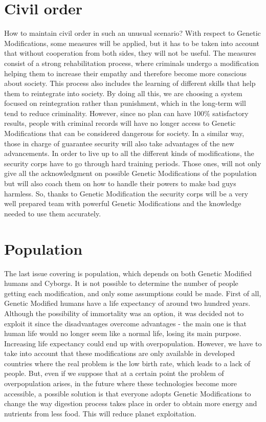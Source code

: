 \section*{Civil order}
\label{sec:order}
How to maintain civil order in such an unusual scenario? With respect to Genetic Modifications, some measures will be applied, but it has to be taken into account that without cooperation from both sides, they will not be useful. The measures consist of a strong rehabilitation process, where criminals undergo a modification helping them to increase their empathy and therefore become more conscious about society. This process also includes the learning of different skills that help them to reintegrate into society. By doing all this, we are choosing a system focused on reintegration rather than punishment, which in the long-term will tend to reduce criminality. However, since no plan can have 100\% satisfactory results, people with criminal records will have no longer access to Genetic Modifications that can be considered dangerous for society. In a similar way, those in charge of guarantee security will also take advantages of the new advancements. In order to live up to all the different kinds of modifications, the security corps have to go through hard training periods. Those ones, will not only give all the acknowledgment on possible Genetic Modifications of the population but will also coach them on how to handle their powers to make bad guys harmless. So, thanks to Genetic Modification the security corps will be a very well prepared team with powerful Genetic Modifications and the knowledge needed to use them accurately. 

\section*{Population}
\label{sec:population}
The last issue covering is population, which depends on both Genetic Modified humans and Cyborgs. It is not possible to determine the number of people getting each modification, and only some assumptions could be made. First of all, Genetic Modified humans have a life expectancy of around two hundred years. Although the possibility of immortality was an option, it was decided not to exploit it since the disadvantages overcome advantages - the main one is that human life would no longer seem like a normal life, losing its main purpose. Increasing life expectancy could end up with overpopulation. However, we have to take into account that these modifications are only available in developed countries where the real problem is the low birth rate, which leads to a lack of people. But, even if we suppose that at a certain point the problem of overpopulation arises, in the future where these technologies become more accessible, a possible solution is that everyone adopts Genetic Modifications to change the way digestion process takes place in order to obtain more energy and nutrients from less food. This will reduce planet exploitation. 

